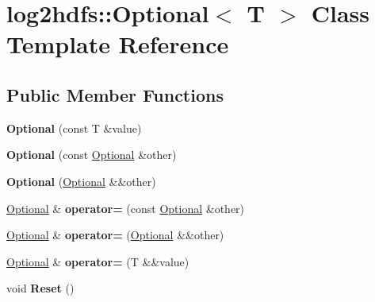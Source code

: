 \hypertarget{classlog2hdfs_1_1Optional}{}\section{log2hdfs\+:\+:Optional$<$ T $>$ Class Template Reference}
\label{classlog2hdfs_1_1Optional}
\subsection*{Public Member Functions}
\begin{DoxyCompactItemize}
\item 
{\bfseries Optional} (const T \&value)\hypertarget{classlog2hdfs_1_1Optional_ac5017107355c941d9eff17d09d3c1fbe}{}\label{classlog2hdfs_1_1Optional_ac5017107355c941d9eff17d09d3c1fbe}

\item 
{\bfseries Optional} (const \hyperlink{classlog2hdfs_1_1Optional}{Optional} \&other)\hypertarget{classlog2hdfs_1_1Optional_abf8008e3913d666fc6d5fb2d1b6a478f}{}\label{classlog2hdfs_1_1Optional_abf8008e3913d666fc6d5fb2d1b6a478f}

\item 
{\bfseries Optional} (\hyperlink{classlog2hdfs_1_1Optional}{Optional} \&\&other)\hypertarget{classlog2hdfs_1_1Optional_a7173ab1140f1bd7b31c5b1341b8d802e}{}\label{classlog2hdfs_1_1Optional_a7173ab1140f1bd7b31c5b1341b8d802e}

\item 
\hyperlink{classlog2hdfs_1_1Optional}{Optional} \& {\bfseries operator=} (const \hyperlink{classlog2hdfs_1_1Optional}{Optional} \&other)\hypertarget{classlog2hdfs_1_1Optional_a79ffca4c46d0c2dd538fba99d52bfc6b}{}\label{classlog2hdfs_1_1Optional_a79ffca4c46d0c2dd538fba99d52bfc6b}

\item 
\hyperlink{classlog2hdfs_1_1Optional}{Optional} \& {\bfseries operator=} (\hyperlink{classlog2hdfs_1_1Optional}{Optional} \&\&other)\hypertarget{classlog2hdfs_1_1Optional_aa1be94247ac80a184dd4230fbec55919}{}\label{classlog2hdfs_1_1Optional_aa1be94247ac80a184dd4230fbec55919}

\item 
\hyperlink{classlog2hdfs_1_1Optional}{Optional} \& {\bfseries operator=} (T \&\&value)\hypertarget{classlog2hdfs_1_1Optional_a3799a9cf8ab820375dc26336064f86ac}{}\label{classlog2hdfs_1_1Optional_a3799a9cf8ab820375dc26336064f86ac}

\item 
void {\bfseries Reset} ()\hypertarget{classlog2hdfs_1_1Optional_a4b027fee43a54f5630b56f870481b37c}{}\label{classlog2hdfs_1_1Optional_a4b027fee43a54f5630b56f870481b37c}


\end{DoxyCompactItemize}

